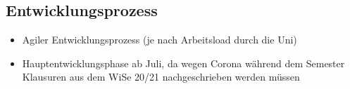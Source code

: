 \subsection{Entwicklungsprozess}
\label{sec:Entwicklungsprozess}
\begin{itemize}
	\item Agiler Entwicklungsprozess (je nach Arbeitsload durch die Uni)
	\item Hauptentwicklungsphase ab Juli, da wegen Corona w\"ahrend dem Semester Klausuren aus dem WiSe 20/21 nachgeschrieben werden m\"ussen
\end{itemize}
